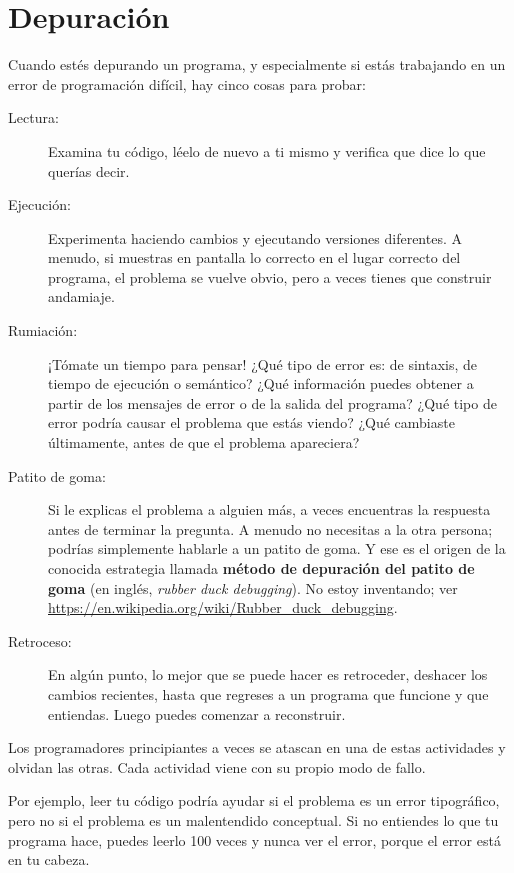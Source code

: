 \documentclass[10pt]{book}
\begin{document}
\section{Depuración}

Cuando estés depurando un programa, y especialmente si estás
trabajando en un error de programación difícil, hay cinco cosas para probar:

\begin{description}

\item[Lectura:] Examina tu código, léelo de nuevo a ti mismo y
verifica que dice lo que querías decir.

\item[Ejecución:] Experimenta haciendo cambios y ejecutando versiones
diferentes.  A menudo, si muestras en pantalla lo correcto en el lugar correcto
del programa, el problema se vuelve obvio, pero a veces tienes que
construir andamiaje.

\item[Rumiación:] ¡Tómate un tiempo para pensar!  ¿Qué tipo de error
es: de sintaxis, de tiempo de ejecución o semántico?  ¿Qué información puedes obtener a partir
de los mensajes de error o de la salida del programa?  ¿Qué tipo de
error podría causar el problema que estás viendo?  ¿Qué cambiaste
últimamente, antes de que el problema apareciera?

\item[Patito de goma:] Si le explicas el problema a alguien más,
  a veces encuentras la respuesta antes de terminar la pregunta.
  A menudo no necesitas a la otra persona; podrías simplemente hablarle a un
  patito de goma.  Y ese es el origen de la conocida estrategia llamada {\bf
  método de depuración del patito de goma} (en inglés, {\em rubber duck debugging}).
  No estoy inventando; ver \url{https://en.wikipedia.org/wiki/Rubber_duck_debugging}.

\item[Retroceso:] En algún punto, lo mejor que se puede hacer es
retroceder, deshacer los cambios recientes, hasta que regreses a un programa que
funcione y que entiendas.  Luego puedes comenzar a reconstruir.

\end{description}

Los programadores principiantes a veces se atascan en una de estas actividades
y olvidan las otras.  Cada actividad viene con su propio modo
de fallo.

Por ejemplo, leer tu código podría ayudar si el problema es un
error tipográfico, pero no si el problema es un malentendido
conceptual.  Si no entiendes lo que tu programa hace,
puedes leerlo 100 veces y nunca ver el error, porque el error está en
tu cabeza.
\end{document}
